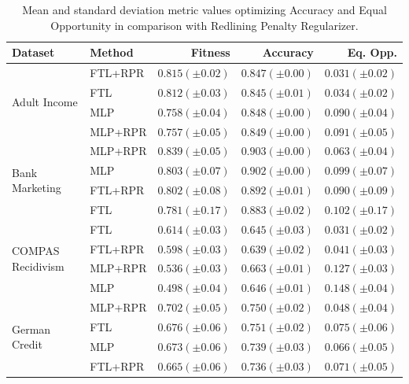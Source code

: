 \begin{table}
    \centering
    \caption{Mean and standard deviation metric values optimizing Accuracy and Equal Opportunity in comparison with Redlining Penalty Regularizer.}\label{tab:complete_acc_opportunity_rpr}
    {\footnotesize \begin{tabular}{llrrr}
    \toprule
    Dataset & Method & Fitness & Accuracy & Eq. Opp. \\
    \midrule
    
    \multirow[t]{4}{*}{Adult Income} & FTL+RPR & $0.815 (\pm0.02)$ & $0.847 (\pm0.00)$ & $0.031 (\pm0.02)$ \\
     & FTL & $0.812 (\pm0.03)$ & $0.845 (\pm0.01)$ & $0.034 (\pm0.02)$ \\
     & MLP & $0.758 (\pm0.04)$ & $0.848 (\pm0.00)$ & $0.090 (\pm0.04)$ \\
     & MLP+RPR & $0.757 (\pm0.05)$ & $0.849 (\pm0.00)$ & $0.091 (\pm0.05)$ \\
    \midrule
    \multirow[t]{4}{*}{Bank Marketing} & MLP+RPR & $0.839 (\pm0.05)$ & $0.903 (\pm0.00)$ & $0.063 (\pm0.04)$ \\
     & MLP & $0.803 (\pm0.07)$ & $0.902 (\pm0.00)$ & $0.099 (\pm0.07)$ \\
     & FTL+RPR & $0.802 (\pm0.08)$ & $0.892 (\pm0.01)$ & $0.090 (\pm0.09)$ \\
     & FTL & $0.781 (\pm0.17)$ & $0.883 (\pm0.02)$ & $0.102 (\pm0.17)$ \\
    \midrule
    \multirow[t]{4}{*}{COMPAS Recidivism} & FTL & $0.614 (\pm0.03)$ & $0.645 (\pm0.03)$ & $0.031 (\pm0.02)$ \\
     & FTL+RPR & $0.598 (\pm0.03)$ & $0.639 (\pm0.02)$ & $0.041 (\pm0.03)$ \\
     & MLP+RPR & $0.536 (\pm0.03)$ & $0.663 (\pm0.01)$ & $0.127 (\pm0.03)$ \\
     & MLP & $0.498 (\pm0.04)$ & $0.646 (\pm0.01)$ & $0.148 (\pm0.04)$ \\
    \midrule
    \multirow[t]{4}{*}{German Credit} & MLP+RPR & $0.702 (\pm0.05)$ & $0.750 (\pm0.02)$ & $0.048 (\pm0.04)$ \\
     & FTL & $0.676 (\pm0.06)$ & $0.751 (\pm0.02)$ & $0.075 (\pm0.06)$ \\
     & MLP & $0.673 (\pm0.06)$ & $0.739 (\pm0.03)$ & $0.066 (\pm0.05)$ \\
     & FTL+RPR & $0.665 (\pm0.06)$ & $0.736 (\pm0.03)$ & $0.071 (\pm0.05)$ \\
     \bottomrule
\end{tabular} }
\end{table}

